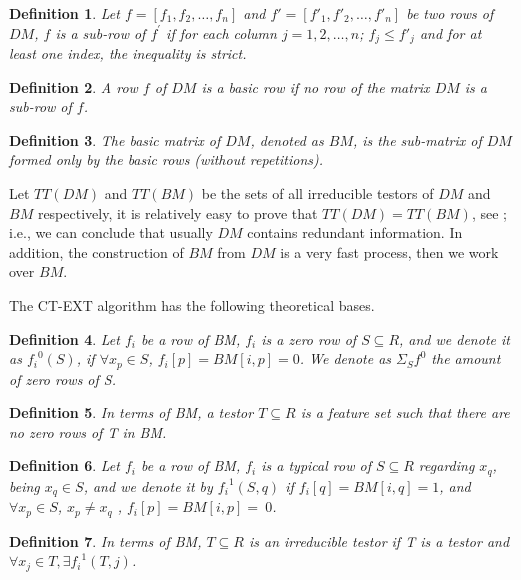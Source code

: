 \documentclass[authoryear,preprint,review,12pt]{elsarticle}
\newtheorem{definition}{Definition}
\begin{document}
\begin{definition}
Let $f=[f_1, f_2, \dots , f_n]$ and $f'=[f'_1, {f'}_2, \dots , {f'}_n]$ be two rows of $DM$, $f$ 
is a sub-row of $f^{'}$ if for each column $j=1,2,\dots ,n$;  $f_{j} \le f'_{j}$ and for at least one index, the 
inequality is strict.
\end{definition}

\begin{definition}
A row $f$ of $DM$ is a basic row if no row of the matrix $DM$ is a sub-row of $f$. 
\end{definition}

\begin{definition}
The basic matrix of $DM$, denoted as $BM$, is the sub-matrix of $DM$ formed only by the basic rows (without 
repetitions).

\end{definition}

Let $TT(DM)$ and $TT(BM)$ be the sets of all irreducible testors of $DM$ and $BM$ respectively, it is 
relatively easy to prove that $TT(DM)=TT(BM)$, see \citep{R32}; i.e., we can conclude that usually $DM$ 
contains redundant information. In addition, the construction of $BM$ from $DM$ is a very fast process, 
then we work over $BM$.

The CT-EXT algorithm has the following theoretical bases.
\begin{definition} \label{def21} Let $f_i$ be a row of BM, $f_i$ is a zero row of $S \subseteq R$, and we denote it as ${f_i}^0 (S)$, if $\forall x_p \in S$, $f_i [p] = BM [i, p] = 0$. We denote as $\Sigma_S f^0$  the amount of zero rows of S.
\end{definition}
\begin{definition} \label{def22} In terms of BM, a testor $T \subseteq R$ is a feature set such that there
are no zero rows of T in BM. 
\end{definition}
\begin{definition} \label{def23} Let $f_i$ be a row of BM, $f_i$ is a typical row of $S \subseteq R$ regarding $x_q$, being $x_q \in S$, and we denote it by ${f_i}^1 (S,q)$ if $f_i [q] = BM [i, q] = 1$, and $\forall x_p \in S$, $x_p \neq x_q$ , $f_i [p] = BM [i, p] =~0$.
\end{definition}

\begin{definition} \label{def24} In terms of BM, $T \subseteq R$ is an irreducible testor if T is a testor and
$\forall x_j \in T, \exists {f_i}^1 (T, j)$.
\end{definition}
\end{document}
